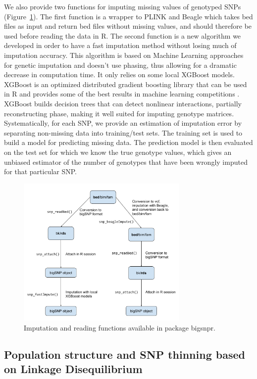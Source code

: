 \documentclass{bioinfo}
\begin{document}
\begin{methods}
We also provide two functions for imputing missing values of genotyped SNPs (Figure~\ref{fig:impute}). The first function is a wrapper to PLINK and Beagle \cite[]{Browning2009} which takes bed files as input and return bed files without missing values, and should therefore be used before reading the data in R. The second function is a new algorithm we developed in order to have a fast imputation method without losing much of imputation accuracy. This algorithm is based on Machine Learning approaches for genetic imputation \cite[]{Wang2012} and doesn't use phasing, thus allowing for a dramatic decrease in computation time. It only relies on some local XGBoost models. XGBoost is an optimized distributed gradient boosting library that can be used in R and provides some of the best results in machine learning competitions \cite[]{Chen2016}. 
XGBoost builds decision trees that can detect nonlinear interactions, partially reconstructing phase, making it well suited for imputing genotype matrices. Systematically, for each SNP, we provide an estimation of imputation error by separating non-missing data into training/test sets. The training set is used to build a model for predicting missing data. The prediction model is then evaluated on the test set for which we know the true genotype values, which gives an unbiased estimator of the number of genotypes that have been wrongly imputed for that particular SNP.

\begin{figure}[!tpb]
\centerline{\includegraphics[width=235pt]{imputation.pdf}}
\caption{Imputation and reading functions available in package bigsnpr.}\label{fig:impute}
\end{figure}


\subsection{Population structure and SNP thinning based on Linkage Disequilibrium} 




\end{methods}
\end{document}
